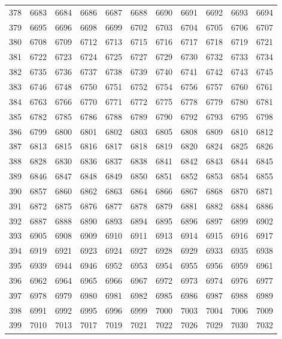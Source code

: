 \begin{longtable}{|r|rrrrrrrrrr|}
  378 & 6683 & 6684 & 6686 & 6687 & 6688 & 6690 & 6691 & 6692 & 6693 & 6694 \\ 
  379 & 6695 & 6696 & 6698 & 6699 & 6702 & 6703 & 6704 & 6705 & 6706 & 6707 \\ 
  380 & 6708 & 6709 & 6712 & 6713 & 6715 & 6716 & 6717 & 6718 & 6719 & 6721 \\ 
  381 & 6722 & 6723 & 6724 & 6725 & 6727 & 6729 & 6730 & 6732 & 6733 & 6734 \\ 
  382 & 6735 & 6736 & 6737 & 6738 & 6739 & 6740 & 6741 & 6742 & 6743 & 6745 \\ 
  383 & 6746 & 6748 & 6750 & 6751 & 6752 & 6754 & 6756 & 6757 & 6760 & 6761 \\ 
  384 & 6763 & 6766 & 6770 & 6771 & 6772 & 6775 & 6778 & 6779 & 6780 & 6781 \\ 
  385 & 6782 & 6785 & 6786 & 6788 & 6789 & 6790 & 6792 & 6793 & 6795 & 6798 \\ 
  386 & 6799 & 6800 & 6801 & 6802 & 6803 & 6805 & 6808 & 6809 & 6810 & 6812 \\ 
  387 & 6813 & 6815 & 6816 & 6817 & 6818 & 6819 & 6820 & 6824 & 6825 & 6826 \\ 
  388 & 6828 & 6830 & 6836 & 6837 & 6838 & 6841 & 6842 & 6843 & 6844 & 6845 \\ 
  389 & 6846 & 6847 & 6848 & 6849 & 6850 & 6851 & 6852 & 6853 & 6854 & 6855 \\ 
  390 & 6857 & 6860 & 6862 & 6863 & 6864 & 6866 & 6867 & 6868 & 6870 & 6871 \\ 
  391 & 6872 & 6875 & 6876 & 6877 & 6878 & 6879 & 6881 & 6882 & 6884 & 6886 \\ 
  392 & 6887 & 6888 & 6890 & 6893 & 6894 & 6895 & 6896 & 6897 & 6899 & 6902 \\ 
  393 & 6905 & 6908 & 6909 & 6910 & 6911 & 6913 & 6914 & 6915 & 6916 & 6917 \\ 
  394 & 6919 & 6921 & 6923 & 6924 & 6927 & 6928 & 6929 & 6933 & 6935 & 6938 \\ 
  395 & 6939 & 6944 & 6946 & 6952 & 6953 & 6954 & 6955 & 6956 & 6959 & 6961 \\ 
  396 & 6962 & 6964 & 6965 & 6966 & 6967 & 6972 & 6973 & 6974 & 6976 & 6977 \\ 
  397 & 6978 & 6979 & 6980 & 6981 & 6982 & 6985 & 6986 & 6987 & 6988 & 6989 \\ 
  398 & 6991 & 6992 & 6995 & 6996 & 6999 & 7000 & 7003 & 7004 & 7006 & 7009 \\ 
  399 & 7010 & 7013 & 7017 & 7019 & 7021 & 7022 & 7026 & 7029 & 7030 & 7032 \\ 

\end{longtable}

